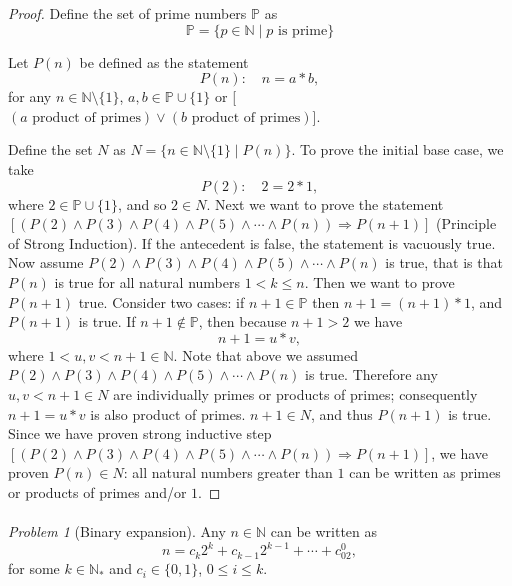 \documentclass[11pt,twoside, reqno, align]{amsart}
\theoremstyle{remark}
\newtheorem{Prob}{Problem}
\def\N{\mathbb N}
\def\P{\mathbb P}
\newcommand{\OR}{\vee}
\newcommand{\AND}{\wedge}
\renewcommand{\implies}{\Rightarrow}
\begin{document}
\begin{proof}

Define the set of prime numbers $\P$ as
$$
\P = \{p \in \N \mid p \text{ is prime}\}
$$

Let $P(n)$ be defined as the statement
$$
P(n): \quad n = a*b,
$$
for any $n \in \N \setminus \{1\}$, $a,b \in \P \cup \{1\}$ or [$(a\text{ product of primes}) \OR (b\text{ product of primes})$]. 

Define the set $N$ as $N = \{ n \in \N \setminus \{1\} \mid P(n)\}$. To prove the initial base case, we take
$$
P(2): \quad 2 = 2*1,
$$
where $2 \in \P \cup \{1\}$, and so $2 \in N$. Next we want to prove the statement $[(P(2) \AND P(3) \AND P(4) \AND P(5) \AND \cdots \AND P(n)) \implies P(n+1)]$ (Principle of Strong Induction). If the antecedent is false, the statement is vacuously true. Now assume $P(2) \AND P(3) \AND P(4) \AND P(5) \AND \cdots \AND P(n)$ is true, that is that $P(n)$ is true for all natural numbers $1 < k \leq n$. Then we want to prove $P(n+1)$ true. Consider two cases: if $n+1 \in \P$ then $n+1 = (n+1)*1$, and $P(n+1)$ is true. If $n+1 \not\in \P$, then because $n+1 > 2$ we have
$$
n+1 = u*v,
$$
where $1 < u,v < n+1 \in \N$. Note that above we assumed $P(2) \AND P(3) \AND P(4) \AND P(5) \AND \cdots \AND P(n)$ is true. Therefore any $u, v < {n+1} \in N$ are individually primes or products of primes; consequently $n+1 = u*v$ is also product of primes. $n+1 \in N$, and thus $P(n+1)$ is true. Since we have proven strong inductive step $[(P(2) \AND P(3) \AND P(4) \AND P(5) \AND \cdots \AND P(n)) \implies P(n+1)]$, we have proven $P(n) \in N$: all natural numbers greater than $1$ can be written as primes or products of primes and/or $1$.
\end{proof}

\paragraph{}

\begin{Prob}[Binary expansion]
Any $n\in \N$ can be written as 
$$
n=c_k2^k+c_{k-1}2^{k-1}+\cdots+c_02^0,
$$
for some $k\in \N_*$ and $c_i\in\{0,1\}$, $0\leq i\leq k$.
\end{Prob}
\end{document}
